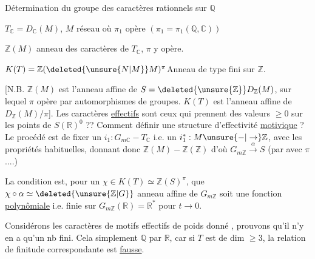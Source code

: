 Détermination du groupe des caractères rationnels sur $\mathbb Q$

$T_{\mathbb C}=D_{\mathbb C}(M)$, $M$ réseau où $\pi_1$ opère  $(\pi_1=\pi_1(\mathbb Q,\mathbb C))$

$\mathbb Z(M)$ anneau des caractères  de $T_{\mathbb C}$, $\pi$ y opère.

$K(T)=\mathbb Z(\deleted{\unsure{N|M}}M)^\pi$\qquad Anneau de type fini sur $\mathbb Z$.

[N.B. $\mathbb Z(M)$ est l'anneau affine de $S=\deleted{\unsure{\mathbb Z}}D_{\mathbb Z}(M)$, sur lequel $\pi$ opère par automorphismes de groupes. $K(T)$ est l'anneau affine de $D_{\mathbb Z}(M)/\pi$]. Les caractères \uline{effectifs} sont ceux qui prennent des valeurs $\geq 0$ sur les points de $S(\mathbb R)^0$ ??  Comment définir une structure d'effectivité \uline{motivique} ? Le procédé  est de  fixer un $i_1:G_{m\mathbb C}-T_{\mathbb C}$ i.e. un $i_1^*:M\unsure{-|\to}\mathbb Z$, avec les propriétés habituelles,  donnant donc $\mathbb Z(M)-\mathbb Z(\mathbb Z)$ d'où $G_{m\mathbb Z}\xrightarrow{\alpha}S$ (par  avec $\pi$....)

La condition est,  pour un $\chi\in K(T)\simeq\mathbb Z(S)^\pi$, que $\chi\circ\alpha\simeq\deleted{\unsure{\mathbb Z|G}}$ anneau affine de $G_{m\mathbb Z}$ soit une fonction \uline{polynômiale} i.e.  finie sur $G_{m\mathbb Z}(\mathbb R)=\mathbb R^*$ pour $t\to0$.

Considérons les caractères de motifs effectifs de poids donné , prouvons qu'il n'y en a qu'un nb fini. Cela    simplement    $\mathbb Q$ par $\mathbb R$,  car si $T$ est de dim $\geq3$, la relation de finitude correspondante est \uline{fausse}.

